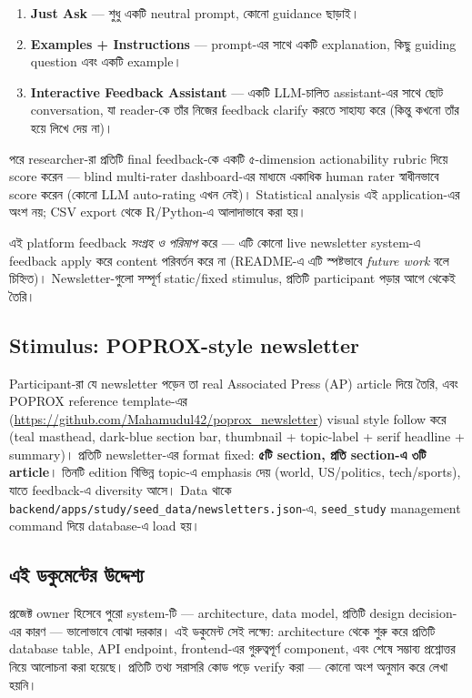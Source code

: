 \documentclass[11pt,a4paper]{article}
\newcommand{\code}[1]{\texttt{\small #1}}
\newcommand{\file}[1]{\texttt{\small #1}}
\newcommand{\summarybox}[1]{%
  \begin{center}
  \colorbox{softbg}{\parbox{0.94\textwidth}{#1}}
  \end{center}
}
\begin{document}
\begin{enumerate}
\item \textbf{Just Ask} --- শুধু একটি neutral prompt, কোনো guidance ছাড়াই।
\item \textbf{Examples + Instructions} --- prompt-এর সাথে একটি explanation, কিছু guiding
      question এবং একটি example।
\item \textbf{Interactive Feedback Assistant} --- একটি LLM-চালিত assistant-এর সাথে ছোট
      conversation, যা reader-কে তাঁর নিজের feedback clarify করতে সাহায্য করে (কিন্তু কখনো
      তাঁর হয়ে লিখে দেয় না)।
\end{enumerate}

পরে researcher-রা প্রতিটি final feedback-কে একটি ৫-dimension actionability rubric দিয়ে score
করেন --- blind multi-rater dashboard-এর মাধ্যমে একাধিক human rater স্বাধীনভাবে score করেন
(কোনো LLM auto-rating এখন নেই)। Statistical analysis এই application-এর অংশ নয়; CSV export
থেকে R/Python-এ আলাদাভাবে করা হয়।

\summarybox{%
  এই platform feedback \textit{সংগ্রহ ও পরিমাপ} করে --- এটি কোনো live newsletter system-এ
  feedback apply করে content পরিবর্তন করে না (README-এ এটি স্পষ্টভাবে \textit{future work}
  বলে চিহ্নিত)। Newsletter-গুলো সম্পূর্ণ static/fixed stimulus, প্রতিটি participant পড়ার
  আগে থেকেই তৈরি।
}

\subsection{Stimulus: POPROX-style newsletter}

Participant-রা যে newsletter পড়েন তা real Associated Press (AP) article দিয়ে তৈরি, এবং
POPROX reference template-এর (\url{https://github.com/Mahamudul42/poprox_newsletter})
visual style follow করে (teal masthead, dark-blue section bar, thumbnail + topic-label +
serif headline + summary)। প্রতিটি newsletter-এর format fixed: \textbf{৫টি section, প্রতি
section-এ ৩টি article}। তিনটি edition বিভিন্ন topic-এ emphasis দেয় (world, US/politics,
tech/sports), যাতে feedback-এ diversity আসে। Data থাকে
\file{backend/apps/study/seed\_data/newsletters.json}-এ, \code{seed\_study} management
command দিয়ে database-এ load হয়।

\subsection{এই ডকুমেন্টের উদ্দেশ্য}

প্রজেক্ট owner হিসেবে পুরো system-টি --- architecture,
data model, প্রতিটি design decision-এর কারণ --- ভালোভাবে বোঝা দরকার। এই ডকুমেন্ট সেই
লক্ষ্যে: architecture থেকে শুরু করে প্রতিটি database table, API endpoint, frontend-এর
গুরুত্বপূর্ণ component, এবং শেষে সম্ভাব্য প্রশ্নোত্তর নিয়ে আলোচনা করা হয়েছে। প্রতিটি তথ্য
সরাসরি কোড পড়ে verify করা --- কোনো অংশ অনুমান করে লেখা হয়নি।
\end{document}
